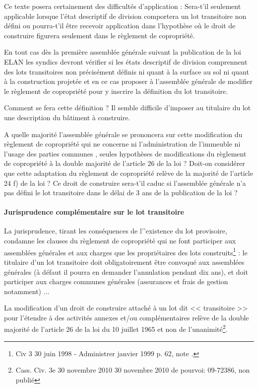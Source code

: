 				Ce texte posera certainement des difficultés d’application : Sera-t’il seulement applicable lorsque l’état descriptif de division comportera un lot transitoire non défini ou pourra-t’il être recevoir application dans l’hypothèse où le droit de construire figurera seulement dans le règlement de copropriété.
				
				En tout cas dès la première assemblée générale suivant la publication de la loi ELAN les syndics devront vérifier si les états descriptif de division comprennent des lots transitoires non précisément définis ni quant à la surface au sol ni quant à la construction projetée et en ce cas proposer à l’assemblée générale de modifier le règlement de copropriété pour y inscrire la définition du lot transitoire.
				
				Comment se fera cette définition ? Il semble difficile d’imposer au titulaire du lot une description du bâtiment à construire.
				
				A quelle majorité l’assemblée générale se prononcera sur cette modification du règlement de copropriété qui ne concerne ni l’administration de l’immeuble ni l’usage des parties communes , seules hypothèses de modifications du règlement de copropriété à la double majorité de l’article 26 de la loi ? Doit-on considérer que cette adaptation du règlement de copropriété relève de la majorité de l’article 24 f) de la loi ?
				Ce droit de construire sera-t’il caduc si l’assemblée générale n’a pas défini le lot transitoire dans le délai de 3 ans de la publication de la loi ?

			\paragraph{Jurisprudence complémentaire sur le lot transitoire}
			
				La jurisprudence, tirant les conséquences de l’’existence du lot provisoire, condamne les clauses du règlement de copropriété qui ne font participer aux assemblées générales et aux charges que les propriétaires des lots construits\footnote{Civ 3\degre{} 30 juin 1998 - Administrer janvier 1999 p. 62, note .} : le titulaire d’un lot transitoire doit obligatoirement être convoqué aux assemblées générales (à défaut il pourra en demander l’annulation pendant dix ans), et doit participer aux charges communes générales (assurances et frais de gestion notamment) $\dots$
				
				La modification d’un droit de construire attaché à un lot dit << transitoire >> pour l’étendre à des activités annexes et/ou complémentaires relève de la double majorité de l’article 26 de la loi du 10 juillet 1965 et non de l’unanimité\footnote{Cass. Civ. 3e 30 novembre 2010 30 novembre 2010 \no de pourvoi: 09-72386, non publié}.
	
